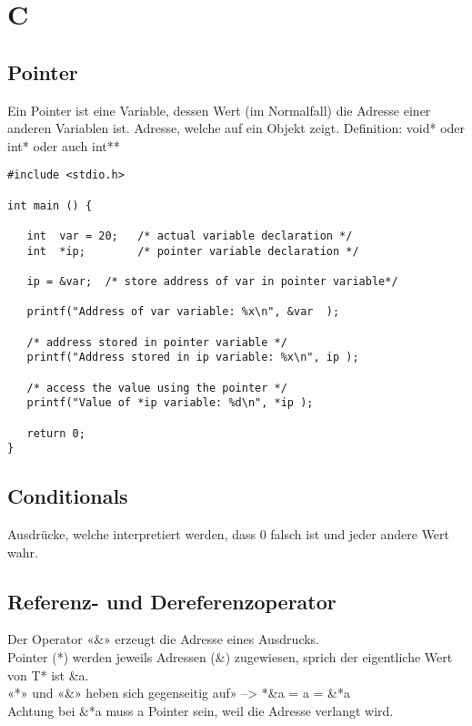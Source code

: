 \section{C}
\subsection{Pointer}
Ein Pointer ist eine Variable, dessen Wert (im Normalfall) die Adresse einer anderen Variablen  ist. Adresse, welche auf ein Objekt zeigt. 
Definition: void* oder int* oder auch int**
\begin{verbatim}
#include <stdio.h>

int main () {

   int  var = 20;   /* actual variable declaration */
   int  *ip;        /* pointer variable declaration */

   ip = &var;  /* store address of var in pointer variable*/

   printf("Address of var variable: %x\n", &var  );

   /* address stored in pointer variable */
   printf("Address stored in ip variable: %x\n", ip );

   /* access the value using the pointer */
   printf("Value of *ip variable: %d\n", *ip );

   return 0;
}
\end{verbatim}
\subsection{Conditionals}
Ausdrücke, welche interpretiert werden, dass 0 falsch ist und jeder andere Wert wahr.
\subsection{Referenz- und Dereferenzoperator}
Der Operator «\&» erzeugt die Adresse eines Ausdrucks. \\
Pointer (*) werden jeweils Adressen (\&) zugewiesen, sprich der eigentliche Wert von T* ist \&a.\\
«*» und «\&» heben sich gegenseitig auf» --> *\&a = a = \&*a \\
Achtung bei \&*a muss a Pointer sein, weil die Adresse verlangt wird.
